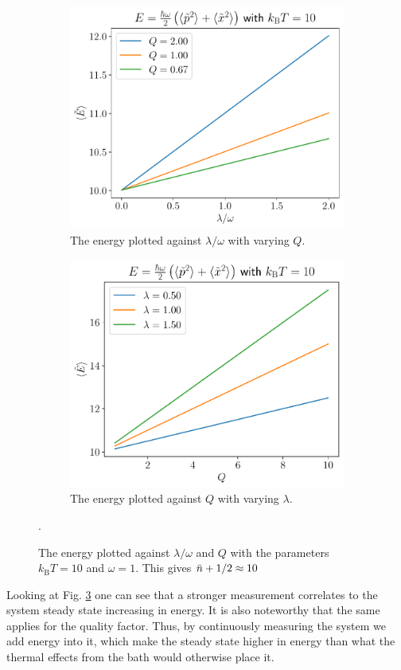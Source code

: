 \begin{figure}[ht]
    \centering
    \begin{subfigure}[t]{0.48\textwidth}
        \includegraphics[width=\textwidth]{figures/E_vs_lambda}
        \caption{The energy plotted against $\lambda / \omega$ with varying $Q$.}
        \label{fig:E_vs_lambda}
    \end{subfigure}
    \hfill
    \begin{subfigure}[t]{0.48\textwidth}
        \includegraphics[width=\textwidth]{figures/E_vs_Q}
        \caption{The energy plotted against $Q$ with varying $\lambda$.}
        \label{fig:E_vs_Q}
    \end{subfigure}
    \caption{The energy plotted against $\lambda / \omega$ and $Q$ with the parameters $k_\mathrm{B}T = 10$ and $\omega = 1$. This gives $\bar{n} + 1/2 \approx 10 $}.
    \label{fig:E_plots}
\end{figure}
Looking at Fig. \ref{fig:E_plots} one can see that a stronger measurement correlates to the system steady state increasing in energy. It is also noteworthy that the same applies for the quality factor. Thus, by continuously measuring the system we add energy into it, which make the steady state higher in energy than what the thermal effects from the bath would otherwise place it. 